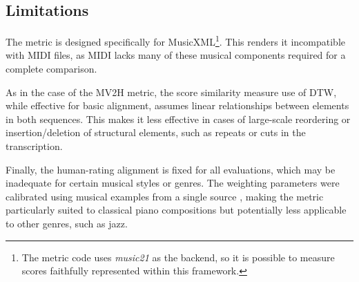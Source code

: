 \subsection{Limitations}

The metric is designed specifically for MusicXML\footnote{The metric code uses \emph{music21} \cite{Cuthbert2010} as the backend, so it is possible to measure scores faithfully represented within this framework.}. This renders it incompatible with MIDI files, as MIDI lacks many of these musical components required for a complete comparison.

As in the case of the MV2H metric, the score similarity measure use of DTW, while effective for basic alignment, assumes linear relationships between elements in both sequences. This makes it less effective in cases of large-scale reordering or insertion/deletion of structural elements, such as repeats or cuts in the transcription.

Finally, the human-rating alignment is fixed for all evaluations, which may be inadequate for certain musical styles or genres. The weighting parameters were calibrated using musical examples from a single source \cite{Kostka1994}, making the metric particularly suited to classical piano compositions but potentially less applicable to other genres, such as jazz.